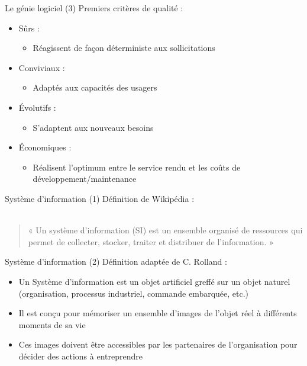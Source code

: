 \documentclass[14pt]{beamer}
\begin{document}
\begin{framentitle}{Le génie logiciel (3)}
    Premiers critères de qualité :
    \begin{itemize}
        \item Sûrs :
            \begin{itemize}
                \item Réagissent de façon déterministe aux sollicitations
            \end{itemize}
        \item Conviviaux :
            \begin{itemize}
                \item Adaptés aux capacités des usagers
            \end{itemize}
        \item Évolutifs :
            \begin{itemize}
                \item S'adaptent aux nouveaux besoins
            \end{itemize}
        \item Économiques :
            \begin{itemize}
                \item Réalisent l'optimum entre le service rendu et les coûts de
                    développement/maintenance
            \end{itemize}
    \end{itemize}
\end{framentitle}

\begin{framentitle}{Système d'information (1)}
    Définition de Wikipédia :\\~
    \begin{quote}
        « Un système d'information (SI) est un ensemble organisé de ressources
        qui permet de collecter, stocker, traiter et distribuer de
        l'information. »
    \end{quote}
\end{framentitle}

\begin{framentitle}{Système d'information (2)}
    Définition adaptée de C. Rolland :
    \begin{itemize}
        \item Un Système d'information est un objet artificiel greffé sur un
            objet naturel (organisation, processus industriel, commande
            embarquée, etc.)
    \item Il est conçu pour mémoriser un ensemble d'images de l'objet réel à
        différents moments de sa vie
    \item Ces images doivent être accessibles par les partenaires de
        l'organisation pour décider des actions à entreprendre
    \end{itemize}
\end{framentitle}
\end{document}
